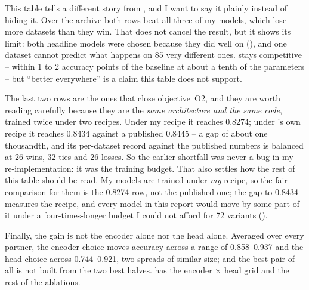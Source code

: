 This table tells a different story from , and I want to say it plainly instead of
hiding it. Over the \ucr{} archive both \millet{} rows beat all three of my models, which lose more
datasets than they win. That does not cancel the \webtraffic{} result, but it shows its limit: both
headline models were chosen because they did well on \webtraffic{} (), and one
dataset cannot predict what happens on 85 very different ones. \seanet{} stays competitive -- within
1 to 2 accuracy points of the baseline at about a tenth of the parameters -- but ``better
everywhere'' is a claim this table does not support.

The last two rows are the ones that close objective~O2, and they are worth reading carefully because
they are the \emph{same architecture and the same code}, trained twice under two recipes. Under my
recipe it reaches 0.8274; under \millet{}'s own recipe it reaches 0.8434 against a published 0.8445
-- a gap of about one thousandth, and its per-dataset record against the published numbers is
balanced at 26 wins, 32 ties and 26 losses. So the earlier shortfall was never a bug in my
re-implementation: it was the training budget. That also settles how the rest of this table should
be read. My models are trained under \emph{my} recipe, so the fair comparison for them is the 0.8274
row, not the published one; the gap to 0.8434 measures the recipe, and every model in this report
would move by some part of it under a four-times-longer budget I could not afford for 72 variants
().

Finally, the gain is not the encoder alone nor the head alone. Averaged over every partner, the
encoder choice moves \webtraffic{} accuracy across a range of 0.858--0.937 and the head choice across
0.744--0.921, two spreads of similar size; and the best pair of all is not built from the two best
halves.  has the encoder $\times$ head grid and the rest of the ablations.
